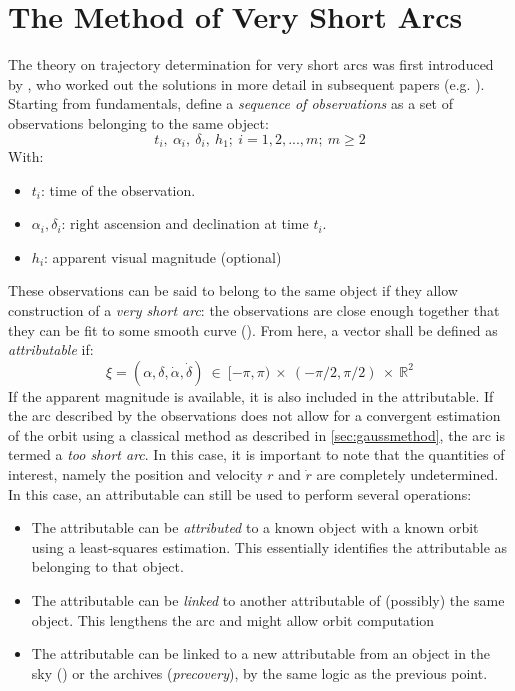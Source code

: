\section{The Method of Very Short Arcs}
The theory on trajectory determination for very short arcs was first introduced by \cite{veryshortarcs}, who worked out the solutions in more detail in subsequent papers (e.g. \cite{veryshortarcstwo}). Starting from fundamentals, define a \textit{sequence of observations} as a set of observations belonging to the same object:
\begin{equation}
    t_i,~\alpha_i,~\delta_i,~h_1;~i = 1, 2, ..., m;~m \geq 2
\end{equation}
With:
\begin{itemize}
    \item $t_i$: time of the observation.
    \item $\alpha_i, \delta_i$: right ascension and declination at time $t_i$.
    \item $h_i$: apparent visual magnitude (optional)
\end{itemize}
These observations can be said to belong to the same object if they allow construction of a \textit{very short arc}: the observations are close enough together that they can be fit to some smooth curve (\cite{classicmodernorbits}). From here, a vector shall be defined as \textit{attributable} if:
\begin{equation}
    \xi = (\alpha, \delta, \dot{\alpha}, \dot{\delta})~\in~[-\pi, \pi)~\times~(-\pi/2, \pi/2)~\times~\mathbb{R}^2
\end{equation}
If the apparent magnitude is available, it is also included in the attributable. If the arc described by the observations does not allow for a convergent estimation of the orbit using a classical method as described in \autoref{sec:gaussmethod}, the arc is termed a \textit{too short arc}. In this case, it is important to note that the quantities of interest, namely the position and velocity $r$ and $\dot{r}$ are completely undetermined. In this case, an attributable can still be used to perform several operations:
\begin{itemize}
    \item The attributable can be \textit{attributed} to a known object with a known orbit using a least-squares estimation. This essentially identifies the attributable as belonging to that object.
    \item The attributable can be \textit{linked} to another attributable of (possibly) the same object. This lengthens the arc and might allow orbit computation
    \item The attributable can be linked to a new attributable from an object in the sky () or the archives (\textit{precovery}), by the same logic as the previous point.
\end{itemize}
